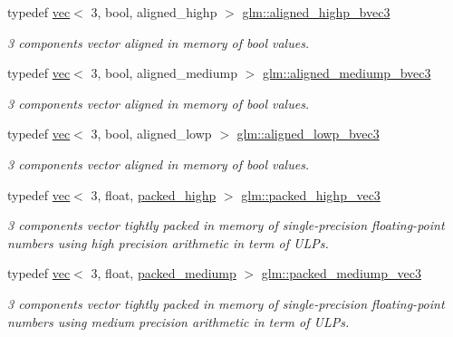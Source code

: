 \begin{DoxyCompactItemize}
typedef \hyperlink{structglm_1_1vec}{vec}$<$ 3, bool, aligned\+\_\+highp $>$ \hyperlink{group__gtc__type__aligned_ga224220a3fc5e5220141a568270cfb405}{glm\+::aligned\+\_\+highp\+\_\+bvec3}
\begin{DoxyCompactList}\small\item\em 3 components vector aligned in memory of bool values. \end{DoxyCompactList}\item 
typedef \hyperlink{structglm_1_1vec}{vec}$<$ 3, bool, aligned\+\_\+mediump $>$ \hyperlink{group__gtc__type__aligned_ga09e9fbc2d4dd00aa1319255fad4d7209}{glm\+::aligned\+\_\+mediump\+\_\+bvec3}
\begin{DoxyCompactList}\small\item\em 3 components vector aligned in memory of bool values. \end{DoxyCompactList}\item 
typedef \hyperlink{structglm_1_1vec}{vec}$<$ 3, bool, aligned\+\_\+lowp $>$ \hyperlink{group__gtc__type__aligned_ga83e413f4dd427d7b3fcbb531fce722be}{glm\+::aligned\+\_\+lowp\+\_\+bvec3}
\begin{DoxyCompactList}\small\item\em 3 components vector aligned in memory of bool values. \end{DoxyCompactList}\item 
typedef \hyperlink{structglm_1_1vec}{vec}$<$ 3, float, \hyperlink{namespaceglm_a36ed105b07c7746804d7fdc7cc90ff25a8e8791ee77fe079b1291f710d88031bf}{packed\+\_\+highp} $>$ \hyperlink{group__gtc__type__aligned_ga6814dd861e658e724ce9e5e673a4486b}{glm\+::packed\+\_\+highp\+\_\+vec3}
\begin{DoxyCompactList}\small\item\em 3 components vector tightly packed in memory of single-\/precision floating-\/point numbers using high precision arithmetic in term of U\+L\+Ps. \end{DoxyCompactList}\item 
typedef \hyperlink{structglm_1_1vec}{vec}$<$ 3, float, \hyperlink{namespaceglm_a36ed105b07c7746804d7fdc7cc90ff25a9604654c3b137cd7898689fd34b25bc0}{packed\+\_\+mediump} $>$ \hyperlink{group__gtc__type__aligned_ga34ad82503f637918457284618bef3a82}{glm\+::packed\+\_\+mediump\+\_\+vec3}
\begin{DoxyCompactList}\small\item\em 3 components vector tightly packed in memory of single-\/precision floating-\/point numbers using medium precision arithmetic in term of U\+L\+Ps. \end{DoxyCompactList}\item 

\end{DoxyCompactItemize}

